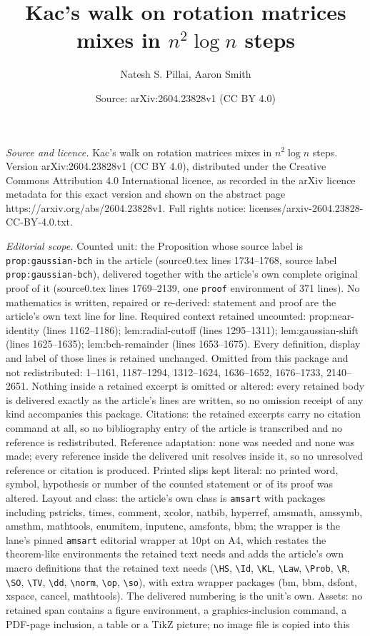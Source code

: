 \documentclass[10pt,a4paper]{amsart}
\title[Kac's walk on rotation matrices mixes in $n^2 \log n$ steps]{Kac's walk on rotation matrices mixes in $n^2 \log n$ steps}
\author{Natesh S. Pillai, Aaron Smith}
\date{Source: arXiv:2604.23828v1 (CC BY 4.0)}
\begin{document}
\maketitle

\noindent\emph{Source and licence.} Kac's walk on rotation matrices mixes in $n^2 \log n$ steps. Version arXiv:2604.23828v1 (CC BY 4.0), distributed under the Creative Commons Attribution 4.0 International licence, as recorded in the arXiv licence metadata for this exact version and shown on the abstract page https://arxiv.org/abs/2604.23828v1. Full rights notice: licenses/arxiv-2604.23828-CC-BY-4.0.txt.\par\smallskip

\noindent\textit{Editorial scope.} Counted unit: the Proposition whose source label is \texttt{prop:gaussian-bch} in the article (source0.tex lines 1734--1768, source label \texttt{prop:gaussian-bch}), delivered together with the article's own complete original proof of it (source0.tex lines 1769--2139, one \texttt{proof} environment of 371 lines). No mathematics is written, repaired or re-derived: statement and proof are the article's own text line for line. Required context retained uncounted: prop:near-identity (lines 1162--1186); lem:radial-cutoff (lines 1295--1311); lem:gaussian-shift (lines 1625--1635); lem:bch-remainder (lines 1653--1675). Every definition, display and label of those lines is retained unchanged. Omitted from this package and not redistributed: 1--1161, 1187--1294, 1312--1624, 1636--1652, 1676--1733, 2140--2651. Nothing inside a retained excerpt is omitted or altered: every retained body is delivered exactly as the article's lines are written, so no omission receipt of any kind accompanies this package. Citations: the retained excerpts carry no citation command at all, so no bibliography entry of the article is transcribed and no reference is redistributed. Reference adaptation: none was needed and none was made; every reference inside the delivered unit resolves inside it, so no unresolved reference or citation is produced. Printed slips kept literal: no printed word, symbol, hypothesis or number of the counted statement or of its proof was altered. Layout and class: the article's own class is \texttt{amsart} with packages including pstricks, times, comment, xcolor, natbib, hyperref, amsmath, amssymb, amsthm, mathtools, enumitem, inputenc, amsfonts, bbm; the wrapper is the lane's pinned \texttt{amsart} editorial wrapper at 10pt on A4, which restates the theorem-like environments the retained text needs and adds the article's own macro definitions that the retained text needs (\texttt{\textbackslash HS}, \texttt{\textbackslash Id}, \texttt{\textbackslash KL}, \texttt{\textbackslash Law}, \texttt{\textbackslash Prob}, \texttt{\textbackslash R}, \texttt{\textbackslash SO}, \texttt{\textbackslash TV}, \texttt{\textbackslash dd}, \texttt{\textbackslash norm}, \texttt{\textbackslash op}, \texttt{\textbackslash so}), with extra wrapper packages (bm, bbm, dsfont, xspace, cancel, mathtools). The delivered numbering is the unit's own. Assets: no retained span contains a figure environment, a graphics-inclusion command, a PDF-page inclusion, a table or a TikZ picture; no image file is copied into this 
\end{document}
